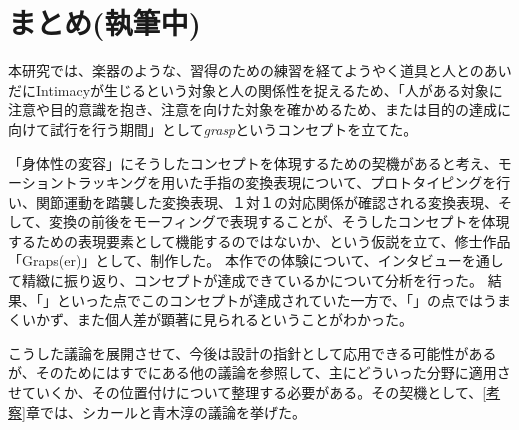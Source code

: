 \chapter{まとめ(執筆中)}
本研究では、楽器のような、習得のための練習を経てようやく道具と人とのあいだにIntimacyが生じるという対象と人の関係性を捉えるため、「人がある対象に注意や目的意識を抱き、注意を向けた対象を確かめるため、または目的の達成に向けて試行を行う期間」として\textit{grasp}というコンセプトを立てた。

「身体性の変容」にそうしたコンセプトを体現するための契機があると考え、モーショントラッキングを用いた手指の変換表現について、プロトタイピングを行い、関節運動を踏襲した変換表現、１対１の対応関係が確認される変換表現、そして、変換の前後をモーフィングで表現することが、そうしたコンセプトを体現するための表現要素として機能するのではないか、という仮説を立て、修士作品「Graps(er)」として、制作した。
本作での体験について、インタビューを通して精緻に振り返り、コンセプトが達成できているかについて分析を行った。
結果、「」といった点でこのコンセプトが達成されていた一方で、「」の点ではうまくいかず、また個人差が顕著に見られるということがわかった。

こうした議論を展開させて、今後は設計の指針として応用できる可能性があるが、そのためにはすでにある他の議論を参照して、主にどういった分野に適用させていくか、その位置付けについて整理する必要がある。その契機として、\ref{考察}章では、シカールと青木淳の議論を挙げた。
